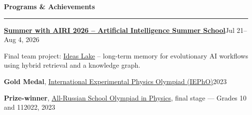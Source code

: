 \documentclass[10pt,a4paper]{article}
\newcommand{\sectiontitle}[1]{%
  \vspace{0.42em}%
  {\normalsize\bfseries\color{accent} #1}\par
  \vspace{0.10em}\hrule\vspace{0.24em}%
}
\newcommand{\entry}[4]{%
  \textbf{#1}\hfill {\color{textgray}#2}\par
  {\color{textgray}#3}\par
  #4\vspace{0.25em}%
}
\newcommand{\achievement}[2]{%
  #1\hfill{\color{textgray}#2}\par
}
\begin{document}
\sectiontitle{Programs \& Achievements}
\entry{\href{https://airi.net/ru/summer-school-2026/}{Summer with AIRI 2026 -- Artificial Intelligence Summer School}}{Jul 21--Aug 4, 2026}{Final team project: \href{https://github.com/n4rly-boop/ideas-lake}{Ideas Lake} -- long-term memory for evolutionary AI workflows using hybrid retrieval and a knowledge graph.}{}
\achievement{\textbf{Gold Medal}, \href{https://iepho.ru/}{International Experimental Physics Olympiad (IEPhO)}}{2023}
\achievement{\textbf{Prize-winner}, \href{https://vos.olimpiada.ru/}{All-Russian School Olympiad in Physics}, final stage — Grades 10 and 11}{2022, 2023}
\end{document}
